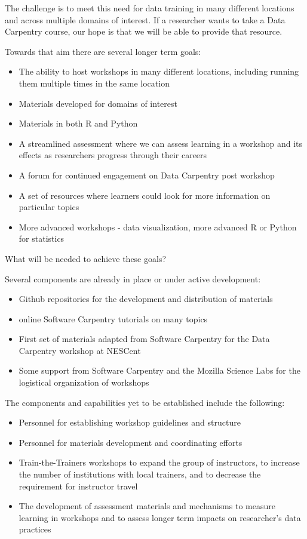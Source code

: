 \documentclass[11pt]{article}
\begin{document}
The challenge is to meet this need for data training in many different locations and across multiple domains of interest.
 If a researcher wants to take a Data Carpentry course, our hope is that we will be able to provide that resource. 
 
Towards that aim there are several longer term goals:

\begin{itemize}
\item The ability to host workshops in many different locations, including running
them multiple times in the same location 
\item Materials developed for domains of interest 
\item Materials in both R and Python 
\item A streamlined assessment where we can assess learning in a workshop and its effects
as researchers progress through their careers
\item A forum for continued engagement on Data Carpentry post workshop
\item A set of resources where learners could look for more information on particular topics
\item More advanced workshops - data visualization, more advanced R or Python for statistics
\end{itemize}


What will be needed to achieve these goals?

Several components are already in place or under active development:
\begin{itemize}
\item Github repositories for the development and distribution of materials
\item online Software Carpentry tutorials on many topics
\item First set of materials adapted from Software Carpentry for the Data Carpentry workshop at NESCent
\item Some support from Software Carpentry and the Mozilla Science Labs for the logistical organization of workshops
\end{itemize}

The components and capabilities yet to be established include the following:
\begin{itemize}
\item Personnel for establishing workshop guidelines and structure
\item Personnel for materials development and coordinating efforts
\item Train-the-Trainers workshops to expand the group of instructors, to increase the number of institutions with local trainers, 
and to decrease the requirement for instructor travel
\item The development of assessment materials and mechanisms to measure learning in workshops and to assess longer term impacts on researcher's data practices
\end{itemize}
\end{document}
